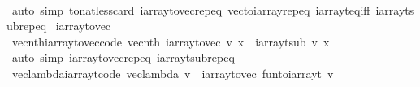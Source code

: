 \begin{isabellebody}
%
\isadelimproof
\ \ %
\endisadelimproof
%
\isatagproof
{}\isamarkupfalse%
\ {\isacharparenleft}{\kern0pt}auto\ simp{\isacharcolon}{\kern0pt}\ to{\isacharunderscore}{\kern0pt}nat{\isacharunderscore}{\kern0pt}less{\isacharunderscore}{\kern0pt}card\ iarray{\isacharunderscore}{\kern0pt}to{\isacharunderscore}{\kern0pt}vec{\isachardot}{\kern0pt}rep{\isacharunderscore}{\kern0pt}eq\ vec{\isacharunderscore}{\kern0pt}to{\isacharunderscore}{\kern0pt}iarray{\isachardot}{\kern0pt}rep{\isacharunderscore}{\kern0pt}eq\ iarray{\isacharunderscore}{\kern0pt}t{\isacharunderscore}{\kern0pt}eq{\isacharunderscore}{\kern0pt}iff\ iarray{\isacharunderscore}{\kern0pt}t{\isacharunderscore}{\kern0pt}sub{\isachardot}{\kern0pt}rep{\isacharunderscore}{\kern0pt}eq{\isacharparenright}{\kern0pt}%
\endisatagproof
{\isafoldproof}%
%
\isadelimproof
\isanewline
%
\endisadelimproof
\isanewline
{}\isamarkupfalse%
\ iarray{\isacharunderscore}{\kern0pt}to{\isacharunderscore}{\kern0pt}vec\isanewline
\isanewline
{}\isamarkupfalse%
\ vec{\isacharunderscore}{\kern0pt}nth{\isacharunderscore}{\kern0pt}iarray{\isacharunderscore}{\kern0pt}to{\isacharunderscore}{\kern0pt}vec{\isacharbrackleft}{\kern0pt}code{\isacharbrackright}{\kern0pt}{\isacharcolon}{\kern0pt}\ {\isachardoublequoteopen}vec{\isacharunderscore}{\kern0pt}nth\ {\isacharparenleft}{\kern0pt}iarray{\isacharunderscore}{\kern0pt}to{\isacharunderscore}{\kern0pt}vec\ v{\isacharparenright}{\kern0pt}\ x\ {\isacharequal}{\kern0pt}\ iarray{\isacharunderscore}{\kern0pt}t{\isacharunderscore}{\kern0pt}sub\ v\ x{\isachardoublequoteclose}\isanewline
%
\isadelimproof
\ \ %
\endisadelimproof
%
\isatagproof
{}\isamarkupfalse%
\ {\isacharparenleft}{\kern0pt}auto\ simp{\isacharcolon}{\kern0pt}\ iarray{\isacharunderscore}{\kern0pt}to{\isacharunderscore}{\kern0pt}vec{\isachardot}{\kern0pt}rep{\isacharunderscore}{\kern0pt}eq\ iarray{\isacharunderscore}{\kern0pt}t{\isacharunderscore}{\kern0pt}sub{\isachardot}{\kern0pt}rep{\isacharunderscore}{\kern0pt}eq{\isacharparenright}{\kern0pt}%
\endisatagproof
{\isafoldproof}%
%
\isadelimproof
\isanewline
%
\endisadelimproof
\isanewline
{}\isamarkupfalse%
\ vec{\isacharunderscore}{\kern0pt}lambda{\isacharunderscore}{\kern0pt}iarray{\isacharunderscore}{\kern0pt}t{\isacharbrackleft}{\kern0pt}code{\isacharbrackright}{\kern0pt}{\isacharcolon}{\kern0pt}\ {\isachardoublequoteopen}vec{\isacharunderscore}{\kern0pt}lambda\ v\ {\isacharequal}{\kern0pt}\ iarray{\isacharunderscore}{\kern0pt}to{\isacharunderscore}{\kern0pt}vec\ {\isacharparenleft}{\kern0pt}fun{\isacharunderscore}{\kern0pt}to{\isacharunderscore}{\kern0pt}iarray{\isacharunderscore}{\kern0pt}t\ v{\isacharparenright}{\kern0pt}{\isachardoublequoteclose}\isanewline

\end{isabellebody}
